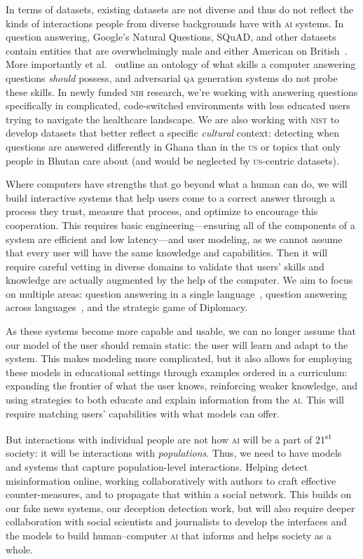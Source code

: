 \documentclass[11pt]{amsart}
\newcommand{\abr}[1]{\textsc{#1}}
\newcommand{\newcite}[2]{\capitalisewords{#1} et al.~\cite{#1-#2}}
\begin{document}
In terms of datasets, existing datasets are not diverse and thus do
not reflect the kinds of interactions people from diverse backgrounds
have with \abr{ai} systems.
%
In question answering, Google's Natural Questions, SQuAD, and other
datasets contain entities that are overwhelmingly male and either
American on British~\cite{gor-21}.
%
More importantly \newcite{rogers}{22} outline an ontology of what
skills a computer answering questions \emph{should} possess, and
adversarial \abr{qa} generation systems do not probe these skills.
%
In newly funded \abr{nih} research, we're working with answering
questions specifically in complicated, code-switched environments with
less educated users trying to navigate the healthcare landscape.
%
We are also working with \abr{nist} to develop datasets that better
reflect a specific \emph{cultural} context: detecting when questions
are answered differently in Ghana than in the \abr{us} or topics that
only people in Bhutan care about (and would be neglected by
\abr{us}-centric datasets).

Where computers have strengths that go beyond what a human can do, we
will build interactive systems that help users come to a correct
answer through a process they trust, measure that process, and
optimize to encourage this cooperation.
%
This requires basic engineering---ensuring all of the components of
a system are efficient and low latency---and user modeling, as we
cannot assume that every user will have the same knowledge and
capabilities.
%
Then it will require careful vetting in diverse domains to validate
that users' skills and knowledge are actually augmented by the help of
the computer.
%
We aim to focus on multiple areas: question answering in a single
language~\cite{He-22}, question answering across
languages~\cite{han-22}, and the strategic game of Diplomacy.

As these systems become more capable and usable, we can no longer
assume that our model of the user should remain static: the user will
learn and adapt to the system.
%
This makes modeling more complicated, but it also allows for employing
these models in educational settings through examples ordered in a
curriculum: expanding the frontier of what the user knows, reinforcing
weaker knowledge, and using strategies to both educate and explain
information from the \abr{ai}.
%
This will require matching users' capabilities with what models can
offer.

But interactions with individual people are not how \abr{ai} will be a
part of 21\textsuperscript{st} society: it will be interactions with
\emph{populations}.
%
Thus, we need to have models and systems that capture population-level
interactions.
%
Helping detect misinformation online, working collaboratively with
authors to craft effective counter-measures, and to propagate that
within a social network.
%
This builds on our fake news systems, our deception detection work,
but will also require deeper collaboration with social scientists and
journalists to develop the interfaces and the models to build
human--computer \abr{ai} that informs and helps society as a whole.
\end{document}
